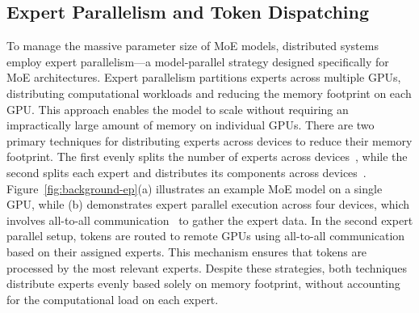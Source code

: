 %
%

\subsection{Expert Parallelism and Token Dispatching}
%
To manage the massive parameter size of MoE models, distributed systems employ expert parallelism—a model-parallel strategy designed specifically for MoE architectures.
%
Expert parallelism partitions experts across multiple GPUs, distributing computational workloads and reducing the memory footprint on each GPU.
% 
This approach enables the model to scale without requiring an impractically large amount of memory on individual GPUs.
% 
There are two primary techniques for distributing experts across devices to reduce their memory footprint. The first evenly splits the number of experts across devices~\cite{deepspeed, deepspeed-moe, megatron, exflow}, while the second splits each expert and distributes its components across devices~\cite{vllm, megatron,singh2023hybrid}.
% 
Figure~\ref{fig:background-ep}(a) illustrates an example MoE model on a single GPU, while (b) demonstrates expert parallel execution across four devices, which involves all-to-all communication~\cite{nccl} to gather the expert data.
% 
In the second expert parallel setup, tokens are routed to remote GPUs using all-to-all communication based on their assigned experts. This mechanism ensures that tokens are processed by the most relevant experts.
% 
Despite these strategies, both techniques distribute experts evenly based solely on memory footprint, without accounting for the computational load on each expert.

